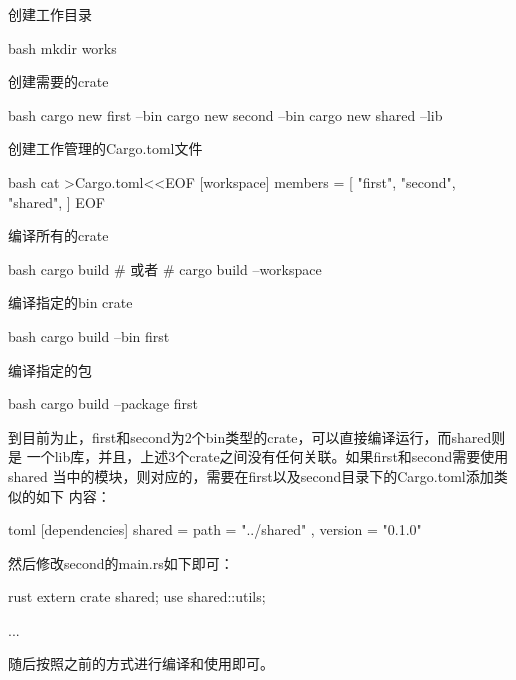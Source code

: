 \begin{outline}[enumerate]
\1 创建工作目录
\begin{code-in-enumerate}{bash}
mkdir works
\end{code-in-enumerate}

\1 创建需要的crate
\begin{code-in-enumerate}{bash}
cargo new first --bin
cargo new second --bin
cargo new shared --lib
\end{code-in-enumerate}

\1 创建工作管理的Cargo.toml文件
\begin{code-in-enumerate}{bash}
cat >Cargo.toml<<EOF
[workspace]
members = [
    "first",
    "second",
    "shared",
]
EOF
\end{code-in-enumerate}

\1 编译所有的crate
\begin{code-in-enumerate}{bash}
cargo build
# 或者
# cargo build --workspace
\end{code-in-enumerate}

\1 编译指定的bin crate
\begin{code-in-enumerate}{bash}
cargo build --bin first
\end{code-in-enumerate}

\1 编译指定的包
\begin{code-in-enumerate}{bash}
cargo build --package first
\end{code-in-enumerate}
\end{outline}

到目前为止，first和second为2个bin类型的crate，可以直接编译运行，而shared则是
一个lib库，并且，上述3个crate之间没有任何关联。如果first和second需要使用shared
当中的模块，则对应的，需要在first以及second目录下的Cargo.toml添加类似的如下
内容：
\begin{code-block}{toml}
[dependencies]
shared = { path = "../shared" , version = "0.1.0"}
\end{code-block}

然后修改second的main.rs如下即可：
\begin{code-block}{rust}
extern crate shared;
use shared::utils;

...
\end{code-block}
随后按照之前的方式进行编译和使用即可。


